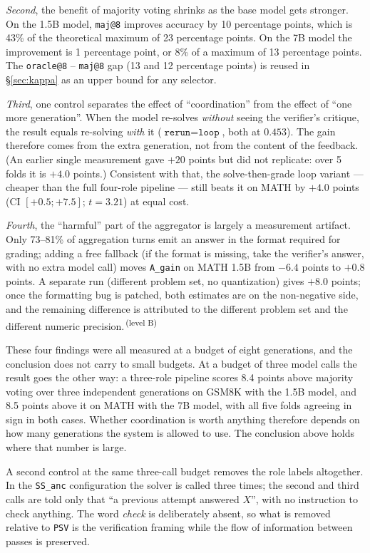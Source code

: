 \documentclass[11pt,a4paper]{article}
\newcommand{\mucB}{\textsuperscript{\,(level B)}}
\begin{document}
\emph{Second}, the benefit of majority voting shrinks as the base model gets stronger. On the 1.5B model, \texttt{maj@8} improves accuracy by 10 percentage points, which is 43\% of the theoretical maximum of 23 percentage points. On the 7B model the improvement is 1 percentage point, or 8\% of a maximum of 13 percentage points. The \texttt{oracle@8} -- \texttt{maj@8} gap (13 and 12 percentage points) is reused in \S\ref{sec:kappa} as an upper bound for any selector.

\emph{Third}, one control separates the effect of ``coordination'' from the effect of ``one more generation''. When the model re-solves \emph{without} seeing the verifier's critique, the result equals re-solving \emph{with} it ($\texttt{rerun} = \texttt{loop}$, both at $0.453$). The gain therefore comes from the extra generation, not from the content of the feedback. (An earlier single measurement gave $+20$ points but did not replicate: over 5 folds it is $+4.0$ points.) Consistent with that, the solve-then-grade loop variant --- cheaper than the full four-role pipeline --- still beats it on MATH by $+4.0$ points (CI $[+0.5;+7.5]$; $t=3.21$) at equal cost.

\emph{Fourth}, the ``harmful'' part of the aggregator is largely a measurement artifact. Only 73--81\% of aggregation turns emit an answer in the format required for grading; adding a free fallback (if the format is missing, take the verifier's answer, with no extra model call) moves \texttt{A\_gain} on MATH 1.5B from $-6.4$ points to $+0.8$ points. A separate run (different problem set, no quantization) gives $+8.0$ points; once the formatting bug is patched, both estimates are on the non-negative side, and the remaining difference is attributed to the different problem set and the different numeric precision.\mucB

These four findings were all measured at a budget of eight generations, and the conclusion does not carry to small budgets. At a budget of three model calls the result goes the other way: a three-role pipeline scores 8.4 points above majority voting over three independent generations on GSM8K with the 1.5B model, and 8.5 points above it on MATH with the 7B model, with all five folds agreeing in sign in both cases. Whether coordination is worth anything therefore depends on how many generations the system is allowed to use. The conclusion above holds where that number is large.

A second control at the same three-call budget removes the role labels altogether. In the
\texttt{SS\_anc} configuration the solver is called three times; the second and third calls are
told only that ``a previous attempt answered $X$'', with no instruction to check anything. The
word \emph{check} is deliberately absent, so what is removed relative to \texttt{PSV} is the
verification framing while the flow of information between passes is preserved.
\end{document}
